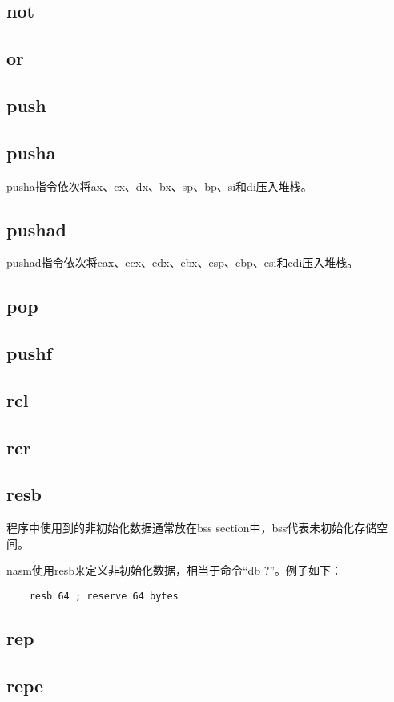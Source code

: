 \documentclass[a4paper,left=2.5cm,right=2.5cm,11pt]{article}
\begin{document}
\subsection{not}
\subsection{or}
\subsection{push}
\subsection{pusha}
	pusha指令依次将ax、cx、dx、bx、sp、bp、si和di压入堆栈。

\subsection{pushad}
	pushad指令依次将eax、ecx、edx、ebx、esp、ebp、esi和edi压入堆栈。

\subsection{pop}
\subsection{pushf}
\subsection{rcl}
\subsection{rcr}
\subsection{resb}
	程序中使用到的非初始化数据通常放在bss section中，bss代表未初始化存储空间。\par

	nasm使用resb来定义非初始化数据，相当于命令“db ?”。例子如下：
	\begin{lstlisting}
	resb 64 ; reserve 64 bytes
	\end{lstlisting}

\subsection{rep}
\subsection{repe}
\end{document}
